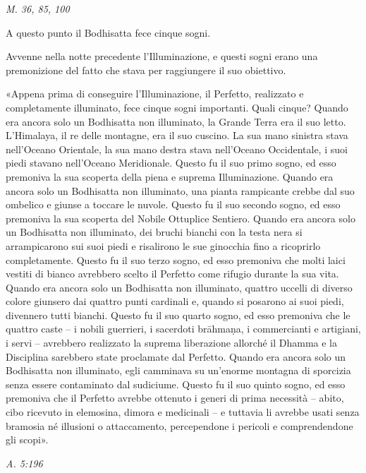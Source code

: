 \emph{M. 36, 85, 100}


 A questo punto il Bodhisatta fece cinque sogni.


 Avvenne nella notte precedente l’Illuminazione, e
questi sogni erano una premonizione del fatto che stava per raggiungere
il suo obiettivo.


 «Appena prima di conseguire l’Illuminazione, il Perfetto,
realizzato e completamente illuminato, fece cinque sogni importanti.
Quali cinque? Quando era ancora solo un Bodhisatta non illuminato, la
Grande Terra era il suo letto. L’Himalaya, il re delle montagne, era il
suo cuscino. La sua mano sinistra stava nell’Oceano Orientale, la sua
mano destra stava nell’Oceano Occidentale, i suoi piedi stavano
nell’Oceano Meridionale. Questo fu il suo primo sogno, ed esso premoniva
la sua scoperta della piena e suprema Illuminazione. Quando era ancora
solo un Bodhisatta non illuminato, una pianta rampicante crebbe dal suo
ombelico e giunse a toccare le nuvole. Questo fu il suo secondo sogno,
ed esso premoniva la sua scoperta del Nobile Ottuplice Sentiero. Quando
era ancora solo un Bodhisatta non illuminato, dei bruchi bianchi con la
testa nera si arrampicarono sui suoi piedi e risalirono le sue ginocchia
fino a ricoprirlo completamente. Questo fu il suo terzo sogno, ed esso
premoniva che molti laici vestiti di bianco avrebbero scelto il Perfetto
come rifugio durante la sua vita. Quando era ancora solo un Bodhisatta
non illuminato, quattro uccelli di diverso colore giunsero dai quattro
punti cardinali e, quando si posarono ai suoi piedi, divennero tutti
bianchi. Questo fu il suo quarto sogno, ed esso premoniva che le quattro
caste – i nobili guerrieri, i sacerdoti brāhmaṇa, i commercianti e
artigiani, i servi – avrebbero realizzato la suprema liberazione
allorché il Dhamma e la Disciplina sarebbero state proclamate dal
Perfetto. Quando era ancora solo un Bodhisatta non illuminato, egli
camminava su un’enorme montagna di sporcizia senza essere contaminato
dal sudiciume. Questo fu il suo quinto sogno, ed esso premoniva che il
Perfetto avrebbe ottenuto i generi di prima necessità – abito, cibo
ricevuto in elemosina, dimora e medicinali – e tuttavia li avrebbe usati
senza bramosia né illusioni o attaccamento, percependone i pericoli e
comprendendone gli scopi».


\emph{A. 5:196}


